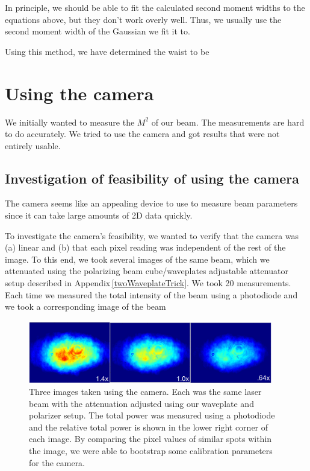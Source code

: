 In principle, we should be able to fit the calculated second moment widths to the equations above, but they don't work overly well. Thus, we usually use the second moment width of the Gaussian we fit it to. 

Using this method, we have determined the waist to be 


\section{Using the camera}
We initially wanted to measure the $M^2$ of our beam. The measurements are hard to do accurately. We tried to use the camera and got results that were not entirely usable.

\subsection{Investigation of feasibility of using the camera}

The camera seems like an appealing device to use to measure beam parameters since it can take large amounts of 2D data quickly.


To investigate the camera's feasibility, we wanted to verify that the camera was (a) linear and (b) that each pixel reading was independent of the rest of the image. To this end, we took several images of the same beam, which we attenuated using the polarizing beam cube/waveplates adjustable attenuator setup described in Appendix\,\ref{twoWaveplateTrick}. We took 20 measurements. Each time we measured the total intensity of the beam using a photodiode and we took a corresponding image of the beam

\begin{figure}
\centerline{
\includegraphics[width=0.95\textwidth]{cameraimage}
}
\caption[Sample Images]{Three images taken using the camera. Each was the same laser beam with the attenuation adjusted using our waveplate and polarizer setup. The total power was measured using a photodiode and the relative total power is shown in the lower right corner of each image. By comparing the pixel values of similar spots within the image, we were able to bootstrap some calibration parameters for the camera.}
\end{figure}

